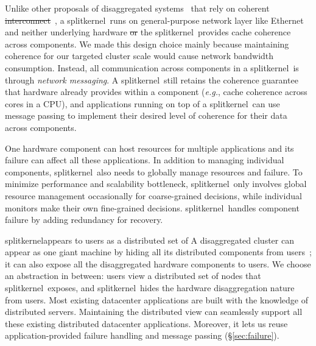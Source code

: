 \documentclass[10pt,times,twocolumn]{z2-article}
\renewcommand{\em}{\it}
\newcommand{\eg}{\textit{e.g.}}
\newcommand{\splitkernel}{splitkernel}
\newcommand{\microos}{monitor}
\providecommand{\DIFaddtex}[1]{{\protect\color{blue}\uwave{#1}}} %
\providecommand{\DIFdeltex}[1]{{\protect\color{red}\sout{#1}}}                      %
\providecommand{\DIFaddbegin}{} %
\providecommand{\DIFaddend}{} %
\providecommand{\DIFdelbegin}{} %
\providecommand{\DIFdelend}{} %
\providecommand{\DIFadd}[1]{\texorpdfstring{\DIFaddtex{#1}}{#1}} %
\providecommand{\DIFdel}[1]{\texorpdfstring{\DIFdeltex{#1}}{}} %
\newcommand{\DIFscaledelfig}{0.5}
\newlength{\DIFdelgraphicswidth} %
\newlength{\DIFdelgraphicsheight} %
\newcommand{\DIFaddincludegraphics}[2][]{{\color{blue}\fbox{\DIFOincludegraphics[#1]{#2}}}} %
\newcommand{\DIFdelincludegraphics}[2][]{%
\sbox{\DIFdelgraphicsbox}{\DIFOincludegraphics[#1]{#2}}%
\settoboxwidth{\DIFdelgraphicswidth}{\DIFdelgraphicsbox} %
\settoboxtotalheight{\DIFdelgraphicsheight}{\DIFdelgraphicsbox} %
\scalebox{\DIFscaledelfig}{%
\parbox[b]{\DIFdelgraphicswidth}{\usebox{\DIFdelgraphicsbox}\\[-\baselineskip] \rule{\DIFdelgraphicswidth}{0em}}\llap{\resizebox{\DIFdelgraphicswidth}{\DIFdelgraphicsheight}{%
\setlength{\unitlength}{\DIFdelgraphicswidth}%
\begin{picture}(1,1)%
\thicklines\linethickness{2pt} %
{\color[rgb]{1,0,0}\put(0,0){\framebox(1,1){}}}%
{\color[rgb]{1,0,0}\put(0,0){\line( 1,1){1}}}%
{\color[rgb]{1,0,0}\put(0,1){\line(1,-1){1}}}%
\end{picture}%
}\hspace*{3pt}}} %
} %
\DeclareRobustCommand{\DIFaddbegin}{\DIFOaddbegin \let\includegraphics\DIFaddincludegraphics} %
\DeclareRobustCommand{\DIFaddend}{\DIFOaddend \let\includegraphics\DIFOincludegraphics} %
\DeclareRobustCommand{\DIFdelbegin}{\DIFOdelbegin \let\includegraphics\DIFdelincludegraphics} %
\DeclareRobustCommand{\DIFdelend}{\DIFOaddend \let\includegraphics\DIFOincludegraphics} %
\begin{document}
{
Unlike other proposals of disaggregated systems~\cite{HP-TheMachine} that rely on coherent \DIFdelbegin \DIFdel{interconnect}\DIFdelend \DIFaddbegin \DIFadd{interconnects}\DIFaddend ~\cite{GenZ,ccix,OpenCAPI},
a \splitkernel\ runs on general-purpose network layer like Ethernet and 
neither underlying hardware \DIFdelbegin \DIFdel{or }\DIFdelend \DIFaddbegin \DIFadd{nor }\DIFaddend the \splitkernel\ provides cache coherence across components.
We made this design choice mainly because maintaining coherence for our targeted cluster scale 
would cause network bandwidth consumption.
Instead, all communication across components in a \splitkernel\ is through {\em network messaging}.
A \splitkernel\ still retains the coherence guarantee that hardware already provides within a component (\eg, cache coherence across cores in a CPU),
and applications running on top of a \splitkernel\ can use message passing to implement their desired level of coherence for their data across components.

One hardware component can host resources for multiple applications and its failure can affect all these applications.
In addition to managing individual components, \splitkernel\ also needs to 
globally manage resources and failure.
To minimize performance and scalability bottleneck,
\splitkernel\ only involves global resource management occasionally for coarse-grained decisions, 
while individual \microos{}s make their own fine-grained decisions.
\splitkernel\ handles component failure by adding redundancy for recovery.



\splitkernel appears to users as a distributed set of 
A disaggregated cluster can appear as one giant machine by hiding all its distributed components from users~\cite{Amoeba-Experience};
it can also expose all the disaggregated hardware components to users.
We choose an abstraction in between: users view a distributed set of nodes that \splitkernel\ exposes,
and \splitkernel\ hides the hardware disaggregation nature from users.
Most existing datacenter applications are built with the knowledge of distributed servers.
Maintaining the distributed view can seamlessly support all these existing distributed datacenter applications.
Moreover, it lets us reuse application-provided failure handling and message passing (\S\ref{sec:failure}).

}
\end{document}
